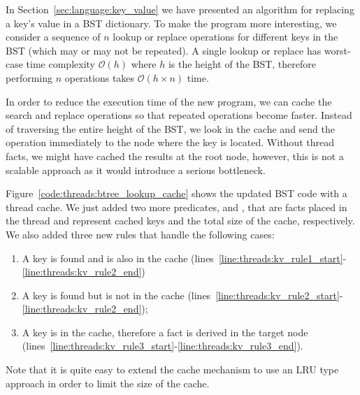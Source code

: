 In Section~\ref{sec:language:key_value} we have presented an algorithm for
replacing a key's value in a BST dictionary. To make the program more
interesting, we consider a sequence of $n$ lookup or replace operations for
different keys in the BST (which may or may not be repeated). A single lookup or
replace has worst-case time complexity $\mathcal{O}(h)$ where $h$ is the height
of the BST, therefore performing $n$ operations takes $\mathcal{O}(h \times n)$
time.

In order to reduce the execution time of the new program, we can cache the
search and replace operations so that repeated operations become faster. Instead
of traversing the entire height of the BST, we look in the cache and send the
operation immediately to the node where the key is located. Without thread
facts, we might have cached the results at the root node, however, this is not a
scalable approach as it would introduce a serious bottleneck.

Figure~\ref{code:threads:btree_lookup_cache} shows the updated BST code with a thread
cache. We just added two more predicates,  and
, that are facts placed in the thread and represent cached
keys and the total size of the cache, respectively. We also added three new
rules that handle the following cases:

\begin{enumerate}
      \item A key is found and is also in the cache
         (lines~\ref{line:threads:kv_rule1_start}-\ref{line:threads:kv_rule2_end})

      \item A key is found but is not in the cache
         (lines~\ref{line:threads:kv_rule2_start}-\ref{line:threads:kv_rule2_end});

      \item A key is in the cache, therefore a  fact is
         derived in the target node
         (lines~\ref{line:threads:kv_rule3_start}-\ref{line:threads:kv_rule3_end}).

\end{enumerate}

Note that it is quite easy to extend the cache mechanism to use an LRU type
approach in order to limit the size of the cache.

